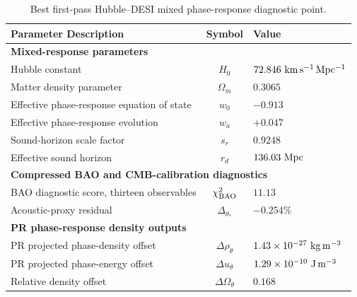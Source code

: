 \documentclass[11pt]{article}
\renewcommand{\arraystretch}{1.22}
\renewcommand{\arraystretch}{1.4}
\begin{document}
\begin{table}[H]
\centering
\caption{Best first-pass Hubble--DESI mixed phase-response diagnostic point.}
\label{tab:hubble_desi_diagnostic_point}
\small
\renewcommand{\arraystretch}{1.28}
\begin{tabular}{p{10.0cm} c p{4.8cm}}
\hline
\textbf{Parameter Description} & \textbf{Symbol} & \textbf{Value} \\ \hline

\multicolumn{3}{l}{\textbf{Mixed-response parameters}} \\ \hline

Hubble constant & \(H_0\) & \(72.846\ {\rm km\,s^{-1}\,Mpc^{-1}}\) \\

Matter density parameter & \(\Omega_m\) & \(0.3065\) \\

Effective phase-response equation of state & \(w_0\) & \(-0.913\) \\

Effective phase-response evolution & \(w_a\) & \(+0.047\) \\

Sound-horizon scale factor & \(s_r\) & \(0.9248\) \\

Effective sound horizon & \(r_d\) & \(136.03\ {\rm Mpc}\) \\ \hline

\multicolumn{3}{l}{\textbf{Compressed BAO and CMB-calibration diagnostics}} \\ \hline

BAO diagnostic score, thirteen observables & \(\chi^2_{\rm BAO}\) & \(11.13\) \\

Acoustic-proxy residual & \(\Delta_{\theta_*}\) & \(-0.254\%\) \\ \hline

\multicolumn{3}{l}{\textbf{PR phase-response density outputs}} \\ \hline

PR projected phase-density offset & \(\Delta\rho_\theta\) & \(1.43\times10^{-27}\ {\rm kg\,m^{-3}}\) \\

PR projected phase-energy offset & \(\Delta u_\theta\) & \(1.29\times10^{-10}\ {\rm J\,m^{-3}}\) \\

Relative density offset & \(\Delta\Omega_\theta\) & \(0.168\) \\ \hline


\end{tabular}
\end{table}
\end{document}
